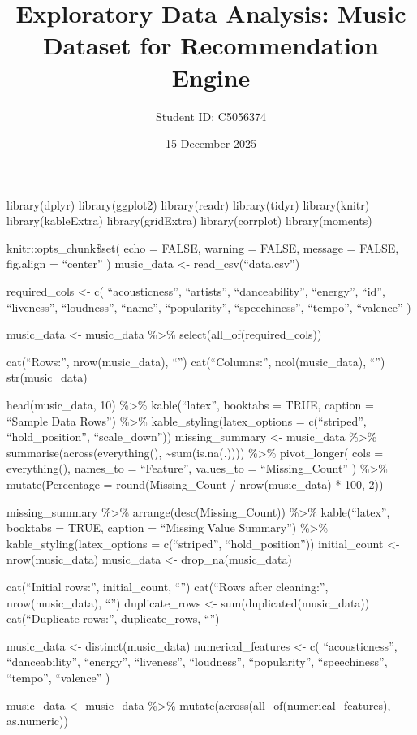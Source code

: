 \documentclass[
]{article}
\title{Exploratory Data Analysis: Music Dataset for Recommendation
Engine}
\author{Student ID: C5056374}
\date{15 December 2025}
\begin{document}
\maketitle

{
\setcounter{tocdepth}{2}
\tableofcontents
}
library(dplyr) library(ggplot2) library(readr) library(tidyr)
library(knitr) library(kableExtra) library(gridExtra) library(corrplot)
library(moments)

knitr::opts\_chunk\$set( echo = FALSE, warning = FALSE, message = FALSE,
fig.align = ``center'' ) music\_data \textless- read\_csv(``data.csv'')

required\_cols \textless- c( ``acousticness'', ``artists'',
``danceability'', ``energy'', ``id'', ``liveness'', ``loudness'',
``name'', ``popularity'', ``speechiness'', ``tempo'', ``valence'' )

music\_data \textless- music\_data \%\textgreater\%
select(all\_of(required\_cols))

cat(``Rows:'', nrow(music\_data), ``\n'') cat(``Columns:'',
ncol(music\_data), ``\n'') str(music\_data)

head(music\_data, 10) \%\textgreater\% kable(``latex'', booktabs = TRUE,
caption = ``Sample Data Rows'') \%\textgreater\%
kable\_styling(latex\_options = c(``striped'', ``hold\_position'',
``scale\_down'')) missing\_summary \textless- music\_data
\%\textgreater\% summarise(across(everything(),
\textasciitilde sum(is.na(.)))) \%\textgreater\% pivot\_longer( cols =
everything(), names\_to = ``Feature'', values\_to = ``Missing\_Count'' )
\%\textgreater\% mutate(Percentage = round(Missing\_Count /
nrow(music\_data) * 100, 2))

missing\_summary \%\textgreater\% arrange(desc(Missing\_Count))
\%\textgreater\% kable(``latex'', booktabs = TRUE, caption = ``Missing
Value Summary'') \%\textgreater\% kable\_styling(latex\_options =
c(``striped'', ``hold\_position'')) initial\_count \textless-
nrow(music\_data) music\_data \textless- drop\_na(music\_data)

cat(``Initial rows:'', initial\_count, ``\n'') cat(``Rows after
cleaning:'', nrow(music\_data), ``\n'') duplicate\_rows \textless-
sum(duplicated(music\_data)) cat(``Duplicate rows:'', duplicate\_rows,
``\n'')

music\_data \textless- distinct(music\_data) numerical\_features
\textless- c( ``acousticness'', ``danceability'', ``energy'',
``liveness'', ``loudness'', ``popularity'', ``speechiness'', ``tempo'',
``valence'' )

music\_data \textless- music\_data \%\textgreater\%
mutate(across(all\_of(numerical\_features), as.numeric))
\end{document}
